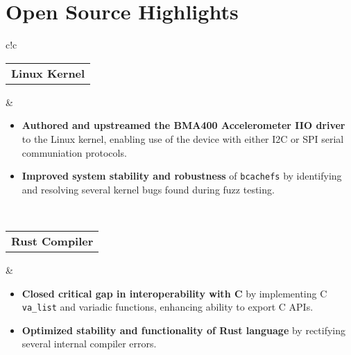 \documentclass[a4paper,skipsamekey,11pt,english]{curve}
\begin{document}
  \section{Open Source Highlights}
  \begin{center}
    {
    \setlength{\tabcolsep}{1em}
    \begin{tabular}{c!{\color{blue}\vrule}c}
      \vspace{1pt}
      {
       \begin{tabular}{c}
         \color{base03}\textbf{Linux Kernel}
       \end{tabular}
      } & {
        \begin{minipage}{5in}
          \vspace{5pt}
          \begin{itemize}
            \item \textbf{Authored and upstreamed the BMA400 Accelerometer IIO
            driver} to the Linux kernel, enabling use of the device with either
            I2C or SPI serial communiation protocols.
            \item \textbf{Improved system stability and robustness} of
            \texttt{bcachefs} by identifying and resolving several kernel
            bugs found during fuzz testing.
          \end{itemize}
        \end{minipage}
      }
      \\
      \hline
      {
       \begin{tabular}{c}
         \color{base03}\textbf{Rust Compiler}
       \end{tabular}
      } & {
        \begin{minipage}{5in}
          \vspace{5pt}
          \begin{itemize}
            \item \textbf{Closed critical gap in interoperability with C} by
            implementing C \texttt{va\_list} and variadic functions, enhancing
            ability to export C APIs.
            \item \textbf{Optimized stability and functionality of Rust language}
            by rectifying several internal compiler errors.
          \end{itemize}
        \end{minipage}
        \vspace{1pt}
      }
      \\

\end{tabular}}
\end{center}
\end{document}
